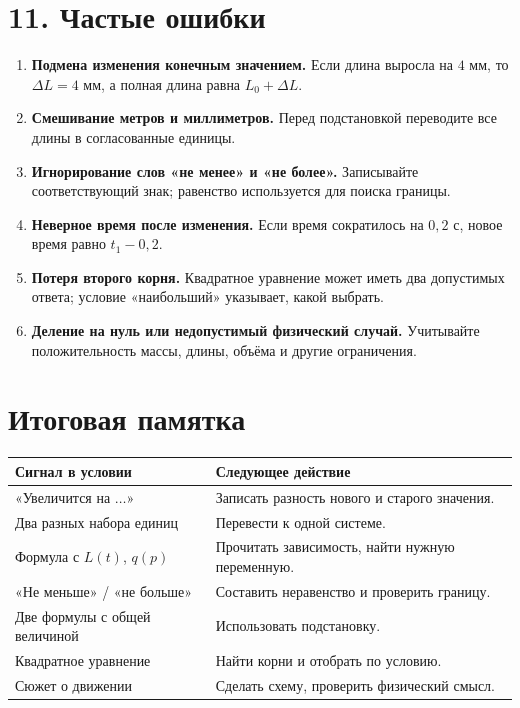\documentclass[a4paper,11pt]{article}
\begin{document}
\clearpage
\section*{11. Частые ошибки}
\begin{enumerate}
\item \textbf{Подмена изменения конечным значением.}
   Если длина выросла на \(4\) мм, то \(\Delta L=4\) мм,
   а полная длина равна \(L_0+\Delta L\).
\item \textbf{Смешивание метров и миллиметров.}
   Перед подстановкой переводите все длины в согласованные единицы.
\item \textbf{Игнорирование слов «не менее» и «не более».}
   Записывайте соответствующий знак; равенство используется для поиска границы.
\item \textbf{Неверное время после изменения.}
   Если время сократилось на \(0{,}2\) с, новое время равно \(t_1-0{,}2\).
\item \textbf{Потеря второго корня.}
   Квадратное уравнение может иметь два допустимых ответа;
   условие «наибольший» указывает, какой выбрать.
\item \textbf{Деление на нуль или недопустимый физический случай.}
   Учитывайте положительность массы, длины, объёма и другие ограничения.
\end{enumerate}

\section*{Итоговая памятка}
\begin{tabularx}{\linewidth}{@{}p{.39\linewidth}X@{}}
\toprule
Сигнал в условии & Следующее действие\\
\midrule
«Увеличится на \(\ldots\)» & Записать разность нового и старого значения.\\
Два разных набора единиц & Перевести к одной системе.\\
Формула с \(L(t)\), \(q(p)\) & Прочитать зависимость, найти нужную переменную.\\
«Не меньше» / «не больше» & Составить неравенство и проверить границу.\\
Две формулы с общей величиной & Использовать подстановку.\\
Квадратное уравнение & Найти корни и отобрать по условию.\\
Сюжет о движении & Сделать схему, проверить физический смысл.\\
\bottomrule
\end{tabularx}
\end{document}

